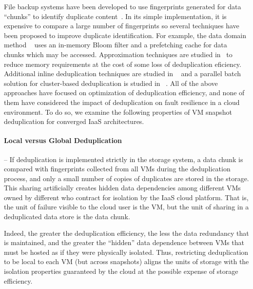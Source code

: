 File backup systems have been developed to use fingerprints generated for
data ``chunks''  to identify duplicate
content~\cite{venti02,Rhea2008}.  In its simple implementation,
it is expensive to compare a large number of 
fingerprints
so several techniques have been proposed to improve duplicate identification. 
For example, the data domain method ~\cite{bottleneck08} 
uses  an in-memory Bloom filter and a prefetching cache for data chunks 
which may be
accessed.  
Approximation techniques are studied in~\cite{extreme_binning09,Guo2011,WeiZhangIEEE}  
to reduce memory requirements at the cost of some loss of deduplication
eficiency.
Additional inline deduplication techniques are studied in ~\cite{sparseindex09,Guo2011,Srinivasan2012}
and a parallel batch solution for cluster-based deduplication is 
studied in ~\cite{wei2013}. 
All of the above approaches have focused on optimization of deduplication
efficiency, and none of them have considered the impact
of deduplication on fault resilience in a cloud environment.  To do so, we
examine the following properties of VM snapshot deduplication for converged
IaaS architectures.
\paragraph*{Local versus Global Deduplication} --
If deduplication is implemented strictly in the storage system,
a data chunk is compared with fingerprints collected from all VMs during
the deduplication process, and only a small number of
copies of duplicates are stored in the storage.  This sharing
artificially creates hidden data dependencies among different VMs owned by
different 
who
contract for isolation 
by the IaaS cloud platform.  That is, the unit of failure visible to the cloud
user is the VM, but the unit of sharing in a deduplicated data store is the
data chunk. 


Indeed, the greater the deduplication efficiency, the less
the data redundancy that is maintained, and the greater the ``hidden'' data
dependence between VMs that must be hosted as if they were physically isolated.
Thus,
restricting deduplication to be local to each VM (but across snapshots) 
aligns the units of storage with the isolation properties guaranteed by the
cloud at the possible expense of storage efficiency.

